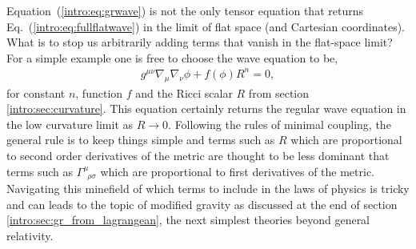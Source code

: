 Equation~(\ref{intro:eq:grwave}) is not the only tensor equation that returns Eq.~(\ref{intro:eq:fullflatwave}) in the limit of flat space (and Cartesian coordinates). What is to stop us arbitrarily adding terms that vanish in the flat-space limit? For a simple example one is free to choose the wave equation to be,
\begin{align}
g^{\mu\nu}\nabla_\mu\nabla_\nu \phi + f(\phi) R^n = 0, \label{intro:eq:modified_wave}
\end{align}
for constant $n$, function $f$ and the Ricci scalar $R$ from section \ref{intro:sec:curvature}. This equation certainly returns the regular wave equation in the low curvature limit as $R\rightarrow 0$. Following the rules of minimal coupling, the general rule is to keep things simple and terms such as $R$ which are proportional to second order derivatives of the metric are thought to be less dominant that terms such as $\Gamma^\mu_{\,\,\,\rho\sigma}$ which are proportional to first derivatives of the metric. Navigating this minefield of which terms to include in the laws of physics is tricky and can leads to the topic of modified gravity as discussed at the end of section \ref{intro:sec:gr_from_lagrangean}, the next simplest theories beyond general relativity.







